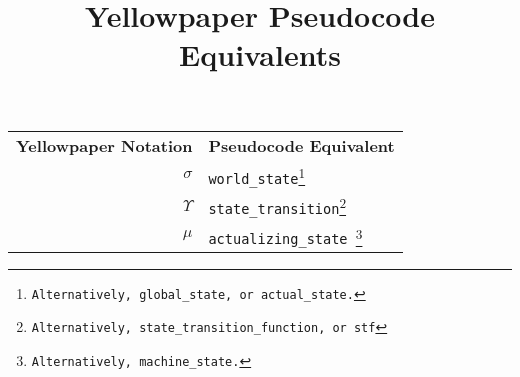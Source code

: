 \documentclass[9pt,a4paper,oneside]{scrartcl}
\author{}
\title{Yellowpaper Pseudocode Equivalents}
\date{}
\begin{document}
\maketitle

\begin{tabular}{rl}
	\textbf{Yellowpaper Notation} & \textbf{Pseudocode Equivalent} \\
	$\sigma$ & \texttt{world\_state\footnote{Alternatively, global\_state, or actual\_state.}} \\
	$\Upsilon$ & \texttt{state\_transition\footnote{Alternatively, state\_transition\_function, or stf}} \\
	$\mu$ & \texttt{actualizing\_state \footnote{Alternatively, machine\_state.}} \\
	
\end{tabular}


\printbibliography
\end{document}
